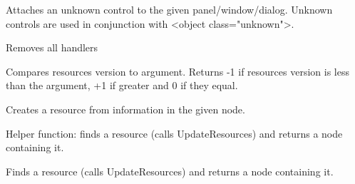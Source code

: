 \label{wxxmlresourceattachunknowncontrol}


Attaches an unknown control to the given panel/window/dialog.
Unknown controls are used in conjunction with <object class="unknown">.


\label{wxxmlresourceclearhandlers}


Removes all handlers


\label{wxxmlresourcecompareversion}


Compares resources version to argument. Returns -1 if resources version
is less than the argument, +1 if greater and 0 if they equal.


\label{wxxmlresourcecreateresfromnode}


Creates a resource from information in the given node.


\label{wxxmlresourcedofindresource}


Helper function: finds a resource (calls UpdateResources) and returns a node containing it.


\label{wxxmlresourcefindresource}


Finds a resource (calls UpdateResources) and returns a node containing it.


\label{wxxmlresourceget}


